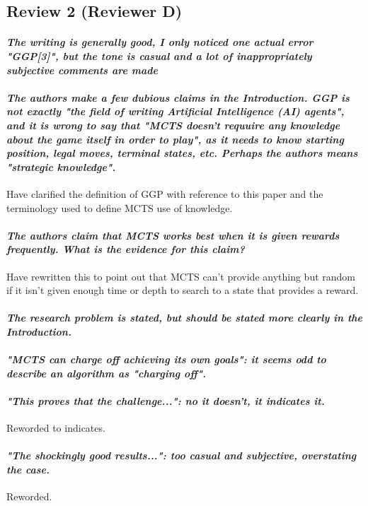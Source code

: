\documentclass{article}
\begin{document}
\subsection{Review 2 (Reviewer D)}
\paragraph*{\textit{The writing is generally good, I only noticed one actual error "GGP[3]", but the tone is casual and a lot of inappropriately subjective comments are made}}
\paragraph*{\textit{The authors make a few dubious claims in the Introduction. GGP is not exactly "the field of writing Artificial Intelligence (AI) agents", and it is wrong to say that "MCTS doesn't requuire any knowledge about the game itself in order to play", as it needs to know starting position, legal moves, terminal states, etc. Perhaps the authors means "strategic knowledge". }}
Have clarified the definition of GGP with reference to this paper\cite{genesereth2005general} and the terminology used to define MCTS use of knowledge. 
\paragraph*{\textit{The authors claim that MCTS works best when it is given rewards frequently. What is the evidence for this claim?}}
Have rewritten this to point out that MCTS can't provide anything but random if it isn't given enough time or depth to search to a state that provides a reward.
\paragraph*{\textit{The research problem is stated, but should be stated more clearly in the Introduction.}}
\paragraph*{\textit{"MCTS can charge off achieving its own goals": it seems odd to describe an algorithm as "charging off".}}
\paragraph*{\textit{"This proves that the challenge...": no it doesn't, it indicates it.}}
Reworded to indicates.
\paragraph*{\textit{"The shockingly good results...": too casual and subjective, overstating the case.}}
Reworded. 
\end{document}
